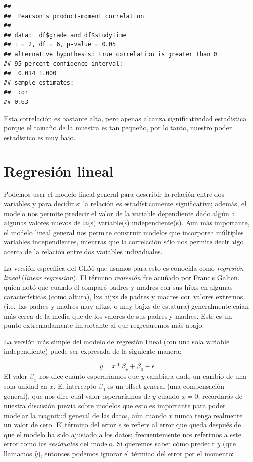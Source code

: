 \documentclass[
  12pt,
]{book}
\begin{document}
\begin{verbatim}
## 
##  Pearson's product-moment correlation
## 
## data:  df$grade and df$studyTime
## t = 2, df = 6, p-value = 0.05
## alternative hypothesis: true correlation is greater than 0
## 95 percent confidence interval:
##  0.014 1.000
## sample estimates:
##  cor 
## 0.63
\end{verbatim}

Esta correlación es bastante alta, pero apenas alcanza significatividad estadística porque el tamaño de la muestra es tan pequeño, por lo tanto, nuestro poder estadístico es muy bajo.

\hypertarget{linear-regression}{%
\section{Regresión lineal}\label{linear-regression}}

Podemos usar el modelo lineal general para describir la relación entre dos variables y para decidir si la relación es estadísticamente significativa; además, el modelo nos permite predecir el valor de la variable dependiente dado algún o algunos valores nuevos de la(s) variable(s) independiente(s). Aún más importante, el modelo lineal general nos permite construir modelos que incorporen múltiples variables independientes, mientras que la correlación sólo nos permite decir algo acerca de la relación entre dos variables individuales.

La versión específica del GLM que usamos para esto es conocida como \emph{regresión lineal} (\emph{linear regression}). El término \emph{regresión} fue acuñado por Francis Galton, quien notó que cuando él comparó padres y madres con sus hijxs en algunas características (como altura), lxs hijxs de padres y madres con valores extremos (i.e.~lxs padres y madres muy altxs, o muy bajxs de estatura) generalmente caían más cerca de la media que de los valores de sus padres y madres. Este es un punto extremadamente importante al que regresaremos más abajo.

La versión más simple del modelo de regresión lineal (con una sola variable independiente) puede ser expresada de la siguiente manera:

\[
y = x * \beta_x + \beta_0 + \epsilon
\]
El valor \(\beta_x\) nos dice cuánto esperaríamos que \(y\) cambiara dado un cambio de una sola unidad en \(x\). El intercepto \(\beta_0\) es un offset general (una compensación general), que nos dice cuál valor esperaríamos de \(y\) cuando \(x=0\); recordarás de nuestra discusión previa sobre modelos que esto es importante para poder modelar la magnitud general de los datos, aún cuando \(x\) nunca tenga realmente un valor de cero. El término del error \(\epsilon\) se refiere al error que queda después de que el modelo ha sido ajustado a los datos; frecuentemente nos referimos a este error como los \emph{residuales} del modelo. Si queremos saber cómo predecir \(y\) (que llamamos \(\hat{y}\)), entonces podemos ignorar el término del error por el momento:
\end{document}
